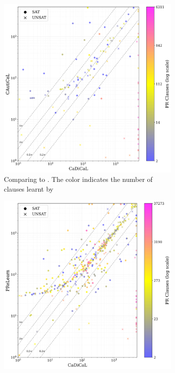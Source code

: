 \begin{figure}[!t]
    \centering
    \begin{subfigure}[t]{0.45\textwidth}
        \centering
        \includegraphics[width=\textwidth]{figs/cadical_vs_cautical_nontrivial.jpg}
        \caption{Comparing \tool to \cadical. The color indicates the number of \pr clauses learnt by \tool}
        \label{fig:cautical-vs-cadical}
    \end{subfigure}
    \begin{subfigure}[t]{0.45\textwidth}
        \centering
        \includegraphics[width=\textwidth]{figs/cadical_vs_prelearn_nontrivial.jpg}

\end{subfigure}
\end{figure}
